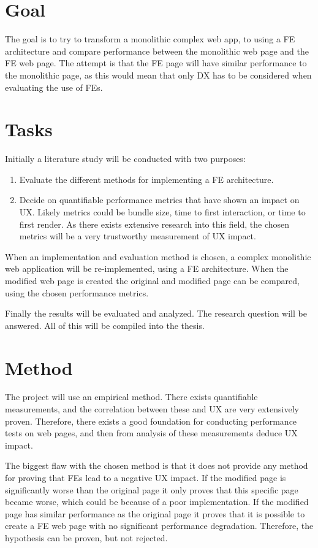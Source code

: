 \documentclass{article}
\newcommand{\fe}{\textmugreek FE}
\begin{document}
\section{Goal}
The goal is to try to transform a monolithic complex web app, to using a \fe{} architecture and compare performance between the monolithic web page and the \fe{} web page. The attempt is that the \fe{} page will have similar performance to the monolithic page, as this would mean that only DX has to be considered when evaluating the use of \fe{}s.

\section{Tasks}
Initially a literature study will be conducted with two purposes:

\begin{enumerate}
    \item Evaluate the different methods for implementing a \fe{} architecture.
    \item Decide on quantifiable performance metrics that have shown an impact on UX. Likely metrics could be bundle size, time to first interaction, or time to first render. As there exists extensive research into this field, the chosen metrics will be a very trustworthy measurement of UX impact.
\end{enumerate}

When an implementation and evaluation method is chosen, a complex monolithic web application will be re-implemented, using a \fe{} architecture. When the modified web page is created the original and modified page can be compared, using the chosen performance metrics.

Finally the results will be evaluated and analyzed. The research question will be answered. All of this will be compiled into the thesis.

\section{Method}
The project will use an empirical method. There exists quantifiable measurements, and the correlation between these and UX are very extensively proven. Therefore, there exists a good foundation for conducting performance tests on web pages, and then from analysis of these measurements deduce UX impact.

The biggest flaw with the chosen method is that it does not provide any method for proving that \fe{}s lead to a negative UX impact. If the modified page is significantly worse than the original page it only proves that this specific page became worse, which could be because of a poor implementation. If the modified page has similar performance as the original page it proves that it is possible to create a \fe{} web page with no significant performance degradation. Therefore, the hypothesis can be proven, but not rejected.
\end{document}
